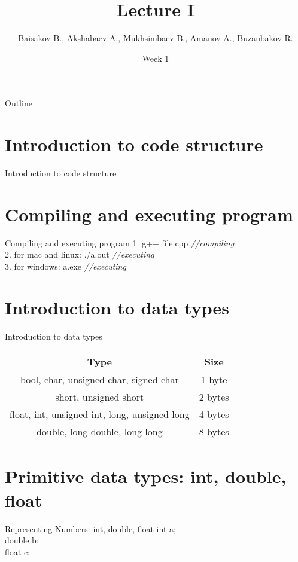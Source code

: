 \documentclass{beamer}
\title[Programming Principles I]{Lecture I}
\author{Baisakov B., Akshabaev A., Mukhsimbaev B., Amanov A., Buzaubakov R.}
\institute{Kazakh-British Technical University}
\date{Week 1}
\begin{document}
    \begin{frame}
      \titlepage
    \end{frame}
    
    \begin{frame}{Outline}
      \tableofcontents
    \end{frame}
    
    \section{Introduction to code structure}
    \begin{frame}{Introduction to code structure}
        
    \end{frame}

    \section{Compiling and executing program}
    \begin{frame}{Compiling and executing program}
      1. g++ file.cpp \textit{//compiling}\\
      2. for mac and linux: ./a.out \textit{//executing}\\
      3. for windows: a.exe \textit{//executing}\\
    \end{frame}

    \section{Introduction to data types}
    \begin{frame}{Introduction to data types}
      \begin{tabular}{ |c | c|  }
        \hline
        Type & Size \\
        \hline
        bool, char, unsigned char, signed char  &	1 byte \\
        short, unsigned short  &	2 bytes \\
        float, int, unsigned int, long, unsigned long & 4 bytes \\
        double, long double, long long &	8 bytes \\
        \hline
       \end{tabular}
    \end{frame}

    \section{Primitive data types: int, double, float}
    \begin{frame}{Representing Numbers: int, double, float}
      int a;\\
      double b;\\
      float c;\\
    \end{frame}
\end{document}
